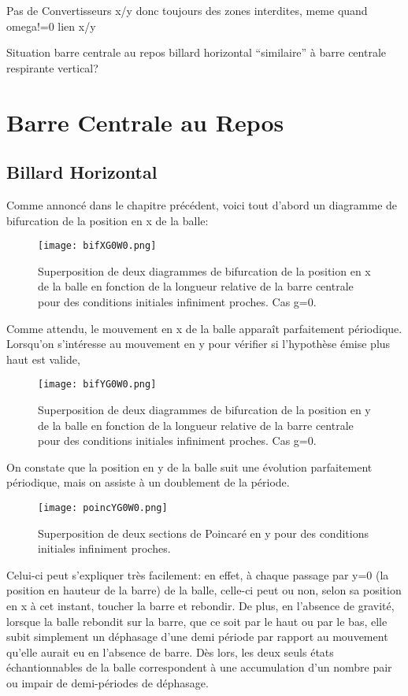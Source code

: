 \documentclass[a4paper]{report}
\begin{document}
Pas de Convertisseurs x/y donc toujours des zones interdites, meme quand omega!=0
lien x/y


Situation barre centrale au repos billard horizontal ``similaire'' à barre centrale respirante vertical?

\chapter{Barre Centrale au Repos}

\section{Billard Horizontal}
\label{sec:xRegHor}
Comme annoncé dans le chapitre précédent, voici tout d'abord un diagramme de bifurcation de la position en x de la balle:
\begin{figure}[h!]
   \texttt{[image: bifXG0W0.png]}
      \caption[Diagramme de bifurcation en x: g=0 ]{Superposition de deux diagrammes de bifurcation de la position en x de la balle en fonction de la longueur relative de la barre centrale pour des conditions initiales infiniment proches. Cas g=0.}
\end{figure}

Comme attendu, le mouvement en x de la balle apparaît parfaitement périodique. Lorsqu'on s'intéresse au mouvement en y pour vérifier si l'hypothèse émise plus haut est valide,
\begin{figure}[h!]
   \texttt{[image: bifYG0W0.png]}
      \caption[Diagramme de bifurcation en y: g=0 ]{Superposition de deux diagrammes de bifurcation de la position en y de la balle en fonction de la longueur relative de la barre centrale pour des conditions initiales infiniment proches. Cas g=0.}
\end{figure}
On constate que la position en y de la balle suit une évolution parfaitement périodique, mais on assiste à un doublement de la période.
\begin{figure}[H]
   \texttt{[image: poincYG0W0.png]}
      \caption[Section de Poincaré en y: g=0 ]{Superposition de deux sections de Poincaré en y pour des conditions initiales infiniment proches.}
\end{figure}

Celui-ci peut s'expliquer très facilement: en effet, à chaque passage par y=0 (la position en hauteur de la barre) de la balle, celle-ci peut ou non, selon sa position en x à cet instant, toucher la barre et rebondir. De plus, en l'absence de gravité, lorsque la balle rebondit sur la barre, que ce soit par le haut ou par le bas, elle subit simplement un déphasage d'une demi période par rapport au mouvement qu'elle aurait eu en l'absence de barre. Dès lors, les deux seuls états échantionnables de la balle correspondent à une accumulation d'un nombre pair ou impair de demi-périodes de déphasage.
\end{document}
